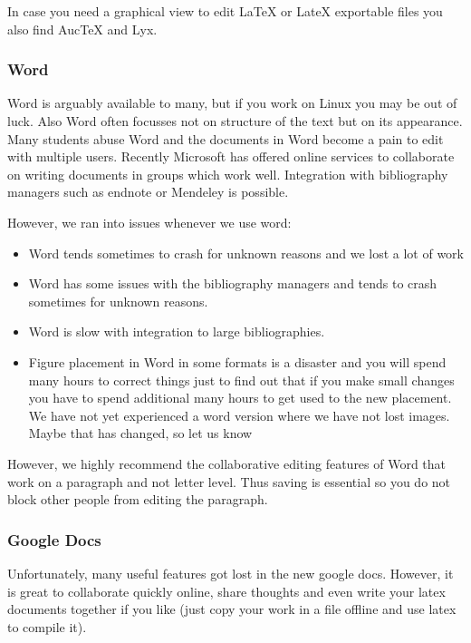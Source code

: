 In case you need a graphical view to edit LaTeX or LateX exportable
files you also find AucTeX and Lyx.

\subsubsection{Word}\label{word}

Word is arguably available to many, but if you work on Linux you may be
out of luck. Also Word often focusses not on structure of the text but
on its appearance. Many students abuse Word and the documents in Word
become a pain to edit with multiple users. Recently Microsoft has
offered online services to collaborate on writing documents in groups
which work well. Integration with bibliography managers such as endnote
or Mendeley is possible.

However, we ran into issues whenever we use word:

\begin{itemize}

\item
  Word tends sometimes to crash for unknown reasons and we lost a lot of
  work
\item
  Word has some issues with the bibliography managers and tends to crash
  sometimes for unknown reasons.
\item
  Word is slow with integration to large bibliographies.
\item
  Figure placement in Word in some formats is a disaster and you will
  spend many hours to correct things just to find out that if you make
  small changes you have to spend additional many hours to get used to
  the new placement. We have not yet experienced a word version where we
  have not lost images. Maybe that has changed, so let us know
\end{itemize}

However, we highly recommend the collaborative editing features of Word
that work on a paragraph and not letter level. Thus saving is essential
so you do not block other people from editing the paragraph.

\subsubsection{Google Docs}\label{google-docs}

Unfortunately, many useful features got lost in the new google docs.
However, it is great to collaborate quickly online, share thoughts and
even write your latex documents together if you like (just copy your
work in a file offline and use latex to compile it).

